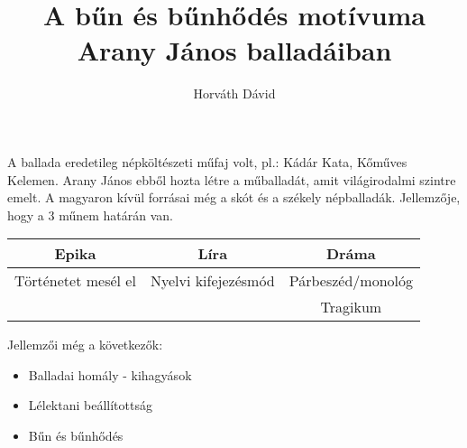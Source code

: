 \documentclass[]{article}
\title{A bűn és bűnhődés motívuma Arany János balladáiban}
\author{Horváth Dávid}
\begin{document}
	
	\maketitle
	
	A ballada eredetileg népköltészeti műfaj volt, pl.: Kádár Kata, Kőműves Kelemen. Arany János ebből hozta létre a műballadát, amit világirodalmi szintre emelt. A magyaron kívül forrásai még a skót és a székely népballadák. Jellemzője, hogy a 3 műnem határán van.
	\begin{center}
		
		\begin{tabular}{|c|c|c|}
			\hline
			Epika&Líra&Dráma\\\hline
			Történetet mesél el&Nyelvi kifejezésmód&Párbeszéd/monológ\\\hline
			&&Tragikum\\\hline
		\end{tabular}
	\end{center}
	Jellemzői még a következők:
	\begin{itemize}
		\item Balladai homály - kihagyások
		\item Lélektani beállítottság
		\item Bűn és bűnhődés
	\end{itemize}
\end{document}
